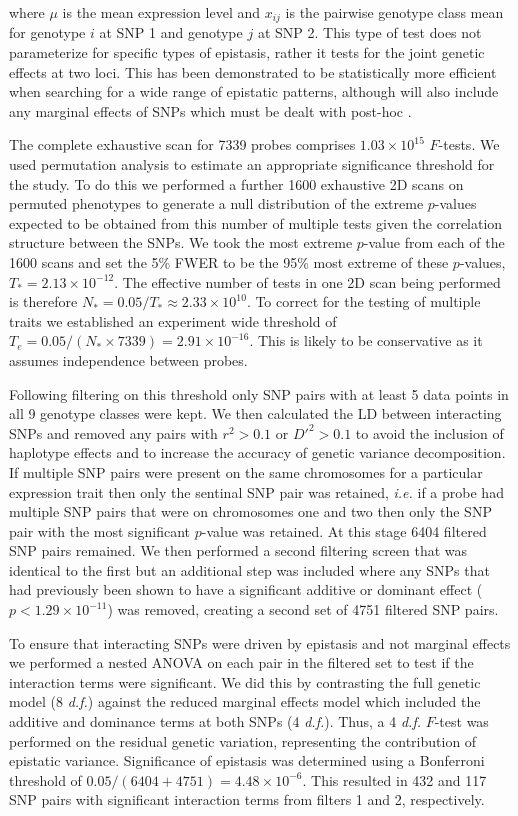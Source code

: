 \documentclass{article}
\begin{document}
where $\mu$ is the mean expression level and $x _{ij}$ is the pairwise genotype class mean for genotype $i$ at SNP 1 and genotype $j$ at SNP 2. This type of test does not parameterize for specific types of epistasis, rather it tests for the joint genetic effects at two loci. This has been demonstrated to be statistically more efficient when searching for a wide range of epistatic patterns, although will also include any marginal effects of SNPs which must be dealt with post-hoc \cite{Hemani2013}.
 
The complete exhaustive scan for 7339 probes comprises $1.03 \times 10^{15}$ $F$-tests. We used permutation analysis to estimate an appropriate significance threshold for the study. To do this we performed a further 1600 exhaustive 2D scans on permuted phenotypes to generate a null distribution of the extreme $p$-values expected to be obtained from this number of multiple tests given the correlation structure between the SNPs. We took the most extreme $p$-value from each of the 1600 scans and set the 5\% FWER to be the 95\% most extreme of these $p$-values, $T_{*} = 2.13 \times 10^{-12}$. The effective number of tests in one 2D scan being performed is therefore $N_{*} = 0.05 / T_{*} \approx 2.33 \times 10^{10}$. To correct for the testing of multiple traits we established an experiment wide threshold of $T_{e} = 0.05 / (N_{*} \times 7339) = 2.91 \times 10^{-16}$. This is likely to be conservative as it assumes independence between probes.

Following filtering on this threshold only SNP pairs with at least 5 data points in all 9 genotype classes were kept. We then calculated the LD between interacting SNPs and removed any pairs with $r^2 > 0.1$ or $D'^{2} > 0.1$ to avoid the inclusion of haplotype effects and to increase the accuracy of genetic variance decomposition. If multiple SNP pairs were present on the same chromosomes for a particular expression trait then only the sentinal SNP pair was retained, \emph{i.e.} if a probe had multiple SNP pairs that were on chromosomes one and two then only the SNP pair with the most significant $p$-value was retained. At this stage 6404 filtered SNP pairs remained. We then performed a second filtering screen that was identical to the first but an additional step was included where any SNPs that had previously been shown to have a significant additive or dominant effect ($p < 1.29 \times 10^{-11}$) was removed, creating a second set of 4751 filtered SNP pairs.

To ensure that interacting SNPs were driven by epistasis and not marginal effects we performed a nested ANOVA on each pair in the filtered set to test if the interaction terms were significant. We did this by contrasting the full genetic model (8 \emph{d.f.}) against the reduced marginal effects model which included the additive and dominance terms at both SNPs (4 \emph{d.f.}). Thus, a 4 \emph{d.f.} $F$-test was performed on the residual genetic variation, representing the contribution of epistatic variance. Significance of epistasis was determined using a Bonferroni threshold of $0.05 / (6404+4751) = 4.48 \times 10^{-6}$. This resulted in 432 and 117 SNP pairs with significant interaction terms from filters 1 and 2, respectively.
\end{document}
